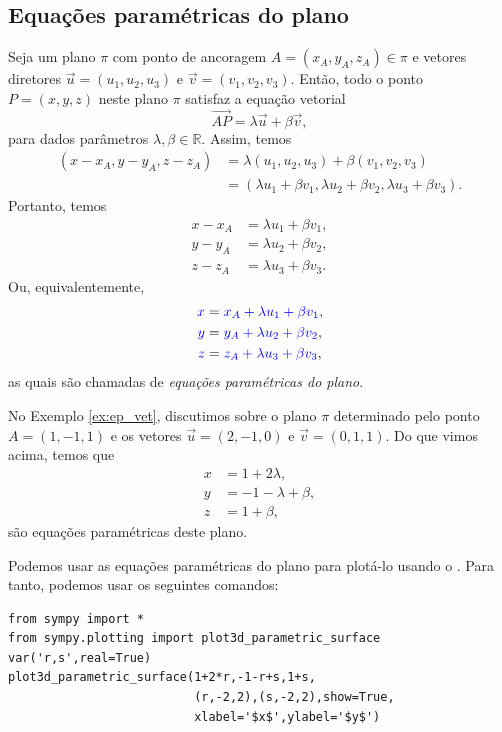 \subsection{Equações paramétricas do plano}

Seja um plano $\pi$ com ponto de ancoragem $A=(x_A,y_A,z_A)\in\pi$ e vetores diretores $\vec{u}=(u_1,u_2,u_3)$ e $\vec{v}=(v_1,v_2,v_3)$. Então, todo o ponto $P=(x,y,z)$ neste plano $\pi$ satisfaz a equação vetorial
\begin{equation}
  \overrightarrow{AP} = \lambda\vec{u}+\beta\vec{v},
\end{equation}
para dados parâmetros $\lambda,\beta\in\mathbb{R}$. Assim, temos
\begin{align}
  (x-x_A,y-y_A,z-z_A) &= \lambda(u_1,u_2,u_3)+\beta(v_1,v_2,v_3)\\
                      &= (\lambda u_1+\beta v_1,\lambda u_2+\beta v_2,\lambda u_3+\beta v_3).
\end{align}
Portanto, temos
\begin{align}
  x-x_A &= \lambda u_1+\beta v_1,\\
  y-y_A &= \lambda u_2+\beta v_2,\\
  z-z_A &= \lambda u_3+\beta v_3.
\end{align}
Ou, equivalentemente,
\begin{align}
  {\color{blue}x} &= {\color{blue}x_A + \lambda u_1+\beta v_1},\\
  {\color{blue}y} &= {\color{blue}y_A + \lambda u_2+\beta v_2},\\
  {\color{blue}z} &= {\color{blue}z_A + \lambda u_3+\beta v_3},
\end{align}
as quais são chamadas de \emph{equações paramétricas do plano}.

\begin{ex}
  No Exemplo \ref{ex:ep_vet}, discutimos sobre o plano $\pi$ determinado pelo ponto $A = (1,-1,1)$ e os vetores $\vec{u}=(2,-1,0)$ e $\vec{v}=(0,1,1)$. Do que vimos acima, temos que
  \begin{align}
    x &= 1 + 2\lambda,\\
    y &= -1 -\lambda + \beta,\\
    z &= 1+\beta,
  \end{align}
  são equações paramétricas deste plano.

  \ifispython
  Podemos usar as equações paramétricas do plano para plotá-lo usando o \sympy. Para tanto, podemos usar os seguintes comandos:
\begin{verbatim}
from sympy import *
from sympy.plotting import plot3d_parametric_surface
var('r,s',real=True)
plot3d_parametric_surface(1+2*r,-1-r+s,1+s,
                          (r,-2,2),(s,-2,2),show=True,
                          xlabel='$x$',ylabel='$y$')
\end{verbatim}
  \fi
\end{ex}

